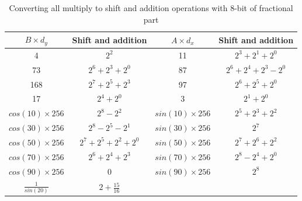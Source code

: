 
\begin{table}[h]
	\centering
	\caption{Converting all multiply to shift and addition operations with 8-bit
	of fractional part}
	\label{tab:mult_2_shift_add}
	\begin{tabular}{|c|c|c|c|}
		\hline
		\textbf{$B \times d_y$} & \textbf{Shift and addition} & \textbf{$A \times d_x$} & \textbf{Shift and addition}
		\\\hline
		4                       & $2^2$                       & 11                      & $2^3 + 2^1 + 2^0$
		\\\hline
		73                      & $2^6 + 2^3 + 2^0$           & 87                      & $2^6 + 2^4 + 2^3 - 2^0$
		\\\hline
		168                     & $2^7 + 2^5 + 2^3$           & 97                      & $2^6 + 2^5 + 2^0$
		\\\hline
		17                      & $2^4 + 2^0$                 & 3                       & $2^1  + 2^0$
		\\\hline
		$cos(10) \times 256$    & $2^8 - 2^2$                 & $sin(10) \times 256$   & $2^5 + 2^3 + 2^2$
		\\\hline
		$cos(30) \times 256$    & $2^8 - 2^5 - 2^1$           & $sin(30) \times 256$   & $2^7 $
		\\\hline
		$cos(50) \times 256$    & $2^7 + 2^5 + 2^2 + 2^0$     & $sin(50) \times 256$   & $2^7 + 2^6 + 2^2$
		\\\hline
		$cos(70) \times 256$    & $2^6 + 2^4 + 2^3 $          & $sin(70) \times 256$   & $2^8 - 2^4 + 2^0$
		\\\hline
		$cos(90) \times 256$    & $0$                         & $sin(90) \times 256$    & $2^8$
		\\\hline
		$\frac{1}{sin(20)}$     & $2  + \frac{15}{16}$        &                         &
		\\\hline
	\end{tabular}
\end{table}

